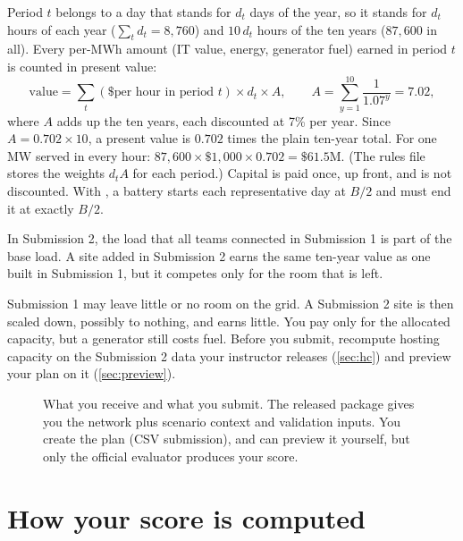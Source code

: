 \documentclass[10pt]{article}
\newcommand{\code}[1]{\path{#1}}
\begin{document}
\begin{keybox}
Period $t$ belongs to a day that stands for $d_t$ days of the year, so it
stands for $d_t$ hours of each year ($\sum_t d_t = 8{,}760$) and $10\,d_t$ hours
of the ten years ($87{,}600$ in all). Every per-MWh amount (IT value, energy,
generator fuel) earned in period $t$ is counted in present value:
\[
  \text{value} = \sum_t (\text{\$ per hour in period } t) \times d_t \times A,
  \qquad
  A = \sum_{y=1}^{10} \frac{1}{1.07^{y}} = 7.02,
\]
where $A$ adds up the ten years, each discounted at 7\% per year. Since
$A = 0.702 \times 10$, a present value is $0.702$ times the plain ten-year total.
For one MW served in every hour: $87{,}600 \times \$1{,}000 \times 0.702 =
\$61.5$M. (The rules file stores the weights $d_t A$ for each period.)
Capital is paid once, up front, and is not discounted. With \code{daily\_exact\_cycle}, a battery starts each
representative day at $B/2$ and must end it at exactly $B/2$.
\end{keybox}

\begin{keybox}
In Submission 2, the load that all teams connected in Submission 1 is part of
the base load. A site added in Submission 2 earns the same ten-year value as
one built in Submission 1, but it competes only for the room that is left.
\end{keybox}

\begin{warningbox}
Submission 1 may leave little or no room on the grid. A Submission 2 site is
then scaled down, possibly to nothing, and earns little. You pay only for the
allocated capacity, but a generator still costs fuel. Before you submit,
recompute hosting capacity on the Submission 2 data your instructor releases
(\cref{sec:hc}) and preview your plan on it (\cref{sec:preview}).
\end{warningbox}

\begin{figure}[htbp]
  \centering
  
  \caption{What you receive and what you submit. The released package gives
  you the network plus scenario context and validation inputs. You create the
  plan (CSV submission), and can preview it yourself, but only the official evaluator
  produces your score.}
  \label{fig:pipeline}
\end{figure}

\section{How your score is computed}\label{sec:score}
\end{document}
